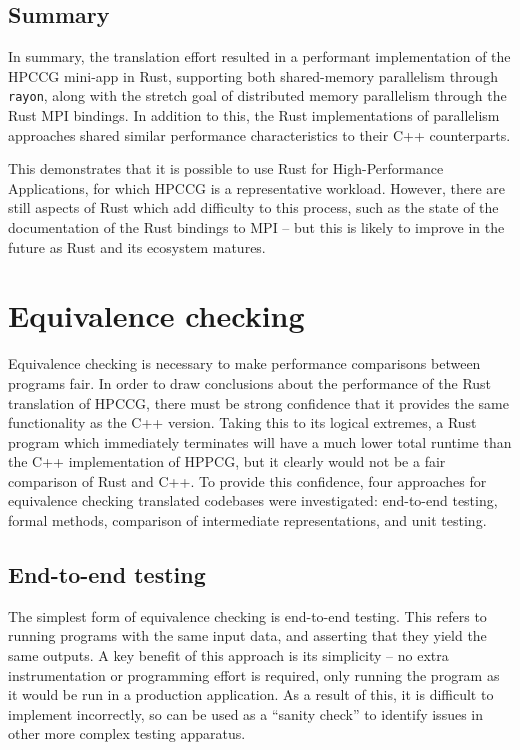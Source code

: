 \subsection{Summary}
\label{sec:translation-summary}

In summary, the translation effort resulted in a performant implementation of the \acrshort{HPCCG} \acrshort{mini-app} in Rust, supporting both shared-memory parallelism through \texttt{rayon}, along with the stretch goal of distributed memory parallelism through the Rust MPI bindings. In addition to this, the Rust implementations of parallelism approaches shared similar performance characteristics to their C++ counterparts.

This demonstrates that it is possible to use Rust for High-Performance Applications, for which \acrshort{HPCCG} is a representative workload. However, there are still aspects of Rust which add difficulty to this process, such as the state of the documentation of the Rust bindings to MPI -- but this is likely to improve in the future as Rust and its ecosystem matures.


\section{Equivalence checking}
\label{sec:equivalence-checking}

Equivalence checking is necessary to make performance comparisons between programs fair. In order to draw conclusions about the performance of the Rust translation of \acrshort{HPCCG}, there must be strong confidence that it provides the same functionality as the C++ version. Taking this to its logical extremes, a Rust program which immediately terminates will have a much lower total runtime than the C++ implementation of HPPCG, but it clearly would not be a fair comparison of Rust and C++.
To provide this confidence, four approaches for equivalence checking translated codebases were investigated: end-to-end testing, formal methods, comparison of intermediate representations, and unit testing.

\subsection{End-to-end testing}
\label{ssec:equivalence-end-to-end}

The simplest form of equivalence checking is end-to-end testing. This refers to running programs with the same input data, and asserting that they yield the same outputs. A key benefit of this approach is its simplicity -- no extra instrumentation or programming effort is required, only running the program as it would be run in a production application. As a result of this, it is difficult to implement incorrectly, so can be used as a ``sanity check'' to identify issues in other more complex testing apparatus.

